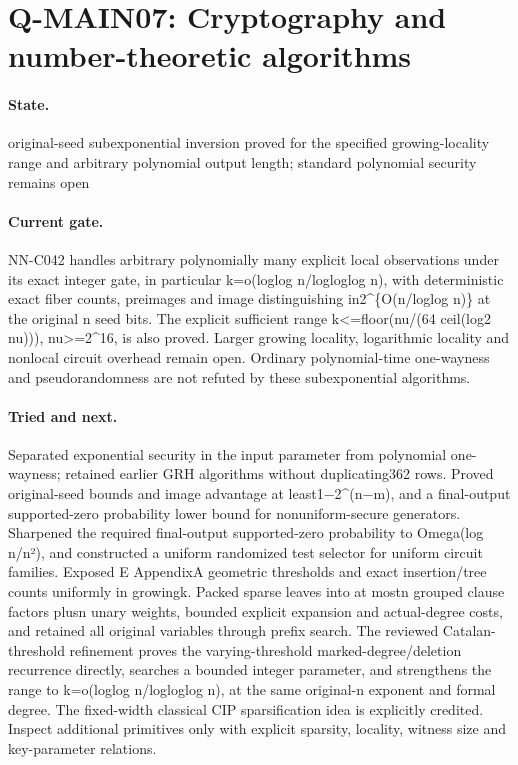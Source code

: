 \section{Q-MAIN07: Cryptography and number-theoretic algorithms}
\paragraph{State.} original-seed subexponential inversion proved for the specified growing-locality range and arbitrary polynomial output length; standard polynomial security remains open
\paragraph{Current gate.} NN-C042 handles arbitrary polynomially many explicit local observations under its exact integer gate, in particular k=o(loglog n/logloglog n), with deterministic exact fiber counts, preimages and image distinguishing in2\textasciicircum{}\{O(n/loglog n)\} at the original n seed bits. The explicit sufficient range k<=floor(nu/(64 ceil(log2 nu))), nu>=2\textasciicircum{}16, is also proved. Larger growing locality, logarithmic locality and nonlocal circuit overhead remain open. Ordinary polynomial-time one-wayness and pseudorandomness are not refuted by these subexponential algorithms.
\paragraph{Tried and next.} Separated exponential security in the input parameter from polynomial one-wayness; retained earlier GRH algorithms without duplicating362 rows. Proved original-seed bounds and image advantage at least1−2\textasciicircum{}(n−m), and a final-output supported-zero probability lower bound for nonuniform-secure generators. Sharpened the required final-output supported-zero probability to Omega(log n/n²), and constructed a uniform randomized test selector for uniform circuit families. Exposed E AppendixA geometric thresholds and exact insertion/tree counts uniformly in growingk. Packed sparse leaves into at mostn grouped clause factors plusn unary weights, bounded explicit expansion and actual-degree costs, and retained all original variables through prefix search. The reviewed Catalan-threshold refinement proves the varying-threshold marked-degree/deletion recurrence directly, searches a bounded integer parameter, and strengthens the range to k=o(loglog n/logloglog n), at the same original-n exponent and formal degree. The fixed-width classical CIP sparsification idea is explicitly credited. Inspect additional primitives only with explicit sparsity, locality, witness size and key-parameter relations.


